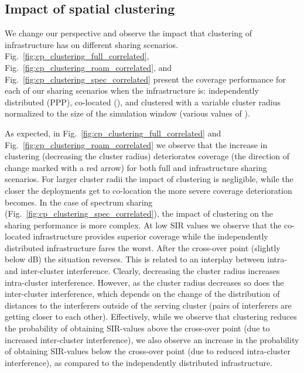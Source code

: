 \documentclass[12pt, journal,doublecolumn, final]{IEEEtran}
\newcommand{\Fig}[1]{Fig.~\ref{fig:#1}}
\begin{document}
\begin{figure*}[tb!]
\centering
{}
}
\subfigure[Frequency-selective fading across shared bands\label{fig:cp_nakagami_uncorrelated}]{
 \texttt{[image: \{cp\_nakagami\_uncorrelated]}.pdf}
 }
\caption{Comparison between coverage probability in various sharing scenarios with Rayleigh fading (dashed lines) and Nakagami-m fading (solid lines), with .}
\label{fig:cp_nakagami}
\end{figure*}

\subsection{Impact of spatial clustering}

We change our perspective and observe the impact that clustering of infrastructure has on different sharing scenarios. \Fig{cp_clustering_full_correlated}, \Fig{cp_clustering_roam_correlated}, and \Fig{cp_clustering_spec_correlated} present the coverage performance for each of our sharing scenarios when the infrastructure is: independently distributed (PPP), co-located (), and clustered with a variable cluster radius normalized to the size of the simulation window (various values of ). 

As expected, in \Fig{cp_clustering_full_correlated} and \Fig{cp_clustering_roam_correlated} we observe that the increase in clustering (decreasing the cluster radius) deteriorates coverage (the direction of change marked with a red arrow) for both full and infrastructure sharing scenarios. For larger cluster radii the impact of clustering is negligible, while the closer the deployments get to co-location the more severe coverage deterioration becomes. In the case of spectrum sharing (\Fig{cp_clustering_spec_correlated}), the impact of clustering on the sharing performance is more complex. At low \ac{SIR} values we observe that the co-located infrastructure provides superior coverage while the independently distributed infrastructure fares the worst. After the cross-over point (slightly below \unit[]{dB}) the situation reverses. This is related to an interplay between intra- and inter-cluster interference. Clearly, decreasing the cluster radius increases intra-cluster interference. However, as the cluster radius decreases so does the inter-cluster interference, which depends on the change of the distribution of distances to the interferers outside of the serving cluster (pairs of interferers are getting closer to each other). Effectively, while we observe that clustering reduces the probability of obtaining \ac{SIR}-values above the cross-over point (due to increased inter-cluster interference), we also observe an increase in the probability of obtaining \ac{SIR}-values below the cross-over point (due to reduced intra-cluster interference), as compared to the independently distributed infrastructure.
\end{document}
